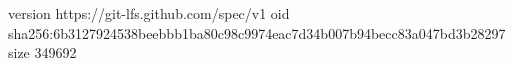 version https://git-lfs.github.com/spec/v1
oid sha256:6b3127924538beebbb1ba80c98c9974eac7d34b007b94becc83a047bd3b28297
size 349692
